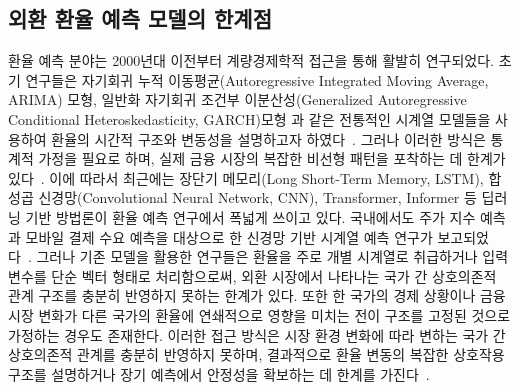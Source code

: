 \titlespacing*{\subsection}{0pt}{1.0em}{0.3em}
\subsection{외환 환율 예측 모델의 한계점}

환율 예측 분야는 2000년대 이전부터 계량경제학적 접근을 통해 활발히 연구되었다. 초기 연구들은 자기회귀 누적 이동평균(Autoregressive Integrated Moving Average, ARIMA) 모형, 일반화 자기회귀 조건부 이분산성(Generalized Autoregressive Conditional Heteroskedasticity, GARCH)모형 과 같은 전통적인 시계열 모델들을 사용하여 환율의 시간적 구조와 변동성을 설명하고자 하였다~\cite{Bollerslev1986GARCH,Engle1982ARCH}. 그러나 이러한 방식은 통계적 가정을 필요로 하며, 실제 금융 시장의 복잡한 비선형 패턴을 포착하는 데 한계가 있다~\cite{Fischer2018}. 이에 따라서 최근에는 장단기 메모리(Long Short-Term Memory, LSTM), 합성곱 신경망(Convolutional Neural Network, CNN), Transformer, Informer 등 딥러닝 기반 방법론이 환율 예측 연구에서 폭넓게 쓰이고 있다. 국내에서도 주가 지수 예측과 모바일 결제 수요 예측을 대상으로 한 신경망 기반 시계열 예측 연구가 보고되었다~\cite{Ha2019WaveletStock,Kim2018MobileDemand}. 그러나 기존 모델을 활용한 연구들은 환율을 주로 개별 시계열로 취급하거나 입력 변수를 단순 벡터 형태로 처리함으로써, 외환 시장에서 나타나는 국가 간 상호의존적 관계 구조를 충분히 반영하지 못하는 한계가 있다. 또한 한 국가의 경제 상황이나 금융 시장 변화가 다른 국가의 환율에 연쇄적으로 영향을 미치는 전이 구조를 고정된 것으로 가정하는 경우도 존재한다. 이러한 접근 방식은 시장 환경 변화에 따라 변하는 국가 간 상호의존적 관계를 충분히 반영하지 못하며, 결과적으로 환율 변동의 복잡한 상호작용 구조를 설명하거나 장기 예측에서 안정성을 확보하는 데 한계를 가진다~\cite{Isufaj2025}.

